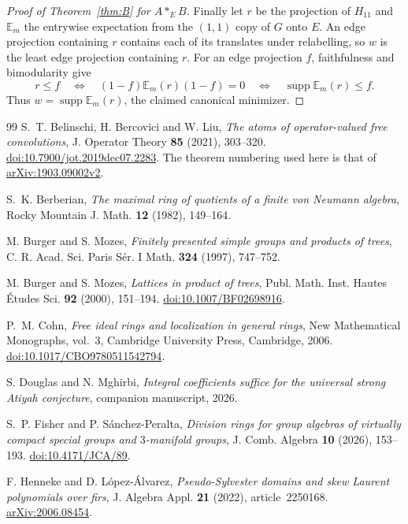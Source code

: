 \documentclass[11pt,a4paper,reqno]{amsart}
\numberwithin{equation}{section}
\theoremstyle{remark}
\DeclareMathOperator{\supp}{supp}
\begin{document}
\begin{proof}[Proof of Theorem~\ref{thm:B} for \(A*_E B\)]
Finally let \(r\) be the projection of \(H_{11}\) and \(\mathbb E_m\) the entrywise expectation from the \((1,1)\) copy of \(G\) onto \(E\). An edge projection containing \(r\) contains each of its translates under relabelling, so \(w\) is the least edge projection containing \(r\). For an edge projection \(f\), faithfulness and bimodularity give
\[
 r\le f
 \quad\Longleftrightarrow\quad
 (1-f)\mathbb E_m(r)(1-f)=0
 \quad\Longleftrightarrow\quad
 \supp\mathbb E_m(r)\le f .
\]
Thus \(w=\supp\mathbb E_m(r)\), the claimed canonical minimizer.
\end{proof}

\begin{thebibliography}{99}
 S.~T. Belinschi, H. Bercovici and W. Liu,
\emph{The atoms of operator-valued free convolutions},
J. Operator Theory \textbf{85} (2021), 303--320.
\href{https://doi.org/10.7900/jot.2019dec07.2283}{doi:10.7900/jot.2019dec07.2283}.
The theorem numbering used here is that of \href{https://arxiv.org/abs/1903.09002v2}{arXiv:1903.09002v2}.

 S.~K. Berberian,
\emph{The maximal ring of quotients of a finite von Neumann algebra},
Rocky Mountain J. Math. \textbf{12} (1982), 149--164.

 M. Burger and S. Mozes, \emph{Finitely presented simple groups and products of trees}, C. R. Acad. Sci. Paris S\'er. I Math. \textbf{324} (1997), 747--752.

 M. Burger and S. Mozes, \emph{Lattices in product of trees}, Publ. Math. Inst. Hautes \'Etudes Sci. \textbf{92} (2000), 151--194. \href{https://doi.org/10.1007/BF02698916}{doi:10.1007/BF02698916}.

 P.~M. Cohn, \emph{Free ideal rings and localization in
general rings}, New Mathematical Monographs, vol.~3, Cambridge University
Press, Cambridge, 2006. \href{https://doi.org/10.1017/CBO9780511542794}{doi:10.1017/CBO9780511542794}.

 S. Douglas and N. Mghirbi, \emph{Integral coefficients suffice for the universal strong Atiyah conjecture}, companion manuscript, 2026.

 S.~P. Fisher and P. S\'anchez-Peralta,
\emph{Division rings for group algebras of virtually compact special groups and
\(3\)-manifold groups}, J. Comb. Algebra \textbf{10} (2026), 153--193.
\href{https://doi.org/10.4171/JCA/89}{doi:10.4171/JCA/89}.

 F. Henneke and D. L\'opez-\'Alvarez,
\emph{Pseudo-Sylvester domains and skew Laurent polynomials over firs},
J. Algebra Appl. \textbf{21} (2022), article~2250168.
\href{https://arxiv.org/abs/2006.08454}{arXiv:2006.08454}.


\end{thebibliography}
\end{document}
